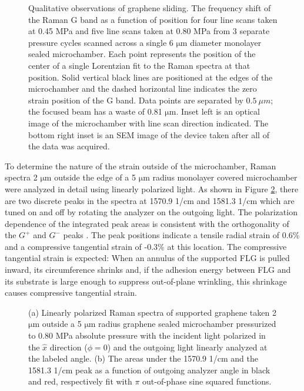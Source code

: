 \begin{figure}
	\begin{center}
	
	\end{center}
	\caption[Qualitative observations of graphene sliding]{\label{fig:fri:qualresults} Qualitative observations of graphene sliding.  The frequency shift of the Raman G band as a function of position for four line scans taken at 0.45 MPa and five line scans taken at 0.80 MPa from 3 separate pressure cycles scanned across a single 6 $\mathrm{\mu}$m diameter monolayer sealed microchamber. Each point represents the position of the center of a single Lorentzian fit to the Raman spectra at that position.  Solid vertical black lines are positioned at the edges of the microchamber and the dashed horizontal line indicates the zero strain position of the G band.  Data points are separated by $0.5 \ \mu m$; the focused beam has a waste of 0.81 $\mathrm{\mu}$m. Inset left is an optical image of the microchamber with line scan direction indicated. The bottom right inset is an SEM image of the device taken after all of the data was acquired.}
\end{figure}

To determine the nature of the strain outside of the microchamber, Raman spectra 2 $\mathrm{\mu}$m outside the edge of a 5 $\mathrm{\mu}$m radius monolayer covered microchamber were analyzed in detail using linearly polarized light.
As shown in Figure \ref{fig:fri:qualout}, there are two discrete peaks in the spectra at 1570.9 1/cm and 1581.3 1/cm which are tuned on and off by rotating the analyzer on the outgoing light.
The polarization dependence of the integrated peak areas is consistent with the orthogonality of the $G^+$ and $G^-$ peaks \cite{Huang2009}.
The peak positions indicate a tensile radial strain of 0.6\% and a compressive tangential strain of -0.3\% at this location.
The compressive tangential strain is expected: When an annulus of the supported FLG is pulled inward, its circumference shrinks and, if the adhesion energy between FLG and its substrate is large enough to suppress out-of-plane wrinkling, this shrinkage causes compressive tangential strain.

\begin{figure}
	\begin{center}
	
	\end{center}
	\caption[Linearly polarized Raman spectra of supported graphene]{\label{fig:fri:qualout} (a) Linearly polarized Raman spectra of supported graphene taken 2 $\mathrm{\mu}$m outside a 5 $\mathrm{\mu}$m radius graphene sealed microchamber pressurized to 0.80 MPa absolute pressure with the incident light polarized in the $\hat x$ direction ($\phi=0$) and the outgoing light linearly analyzed at the labeled angle. (b) The areas under the 1570.9 1/cm and the 1581.3 1/cm peak as a function of outgoing analyzer angle in black and red, respectively fit with $\pi$ out-of-phase sine squared functions.}
\end{figure}

